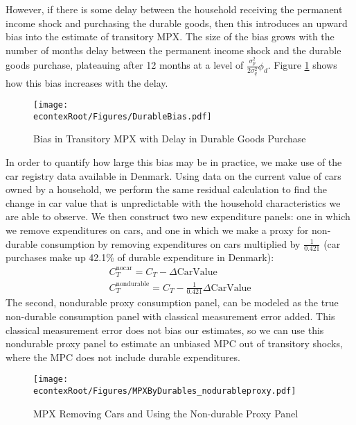 \documentclass[titlepage]{\econtex}\newcommand{\texname}{ConsumptionHeterogeneity}
\begin{document}
However, if there is some delay between the household receiving the permanent income shock and purchasing the durable goods, then this introduces an upward bias into the estimate of transitory MPX. The size of the bias grows with the number of months delay between the permanent income shock and the durable goods purchase, plateauing after 12 months at a level of $\frac{\sigma^2_p}{2\sigma^2_q}\phi_d$. Figure \ref{fig:durable_bias} shows how this bias increases with the delay.
\begin{figure} 
	\begin{centering}
		\texttt{[image: \\econtexRoot/Figures/DurableBias.pdf]}
		\caption{Bias in Transitory MPX with Delay in Durable Goods Purchase}
		\label{fig:durable_bias}
	\end{centering}
\end{figure}

In order to quantify how large this bias may be in practice, we make use of the car registry data available in Denmark. Using data on the current value of cars owned by a household, we perform the same residual calculation to find the change in car value that is unpredictable with the household characteristics we are able to observe. We then construct two new expenditure panels: one in which we remove expenditures on cars, and one in which we make a proxy for non-durable consumption by removing expenditures on cars multiplied by $\frac{1}{0.421}$ (car purchases make up 42.1\% of durable expenditure in Denmark):
\begin{align*}
C_T^{\text{nocar}} = C_T - \Delta \text{CarValue} \\
C_T^{\text{nondurable}} = C_T - \frac{1}{0.421}\Delta \text{CarValue}
\end{align*}
The second, nondurable proxy consumption panel, can be modeled as the true non-durable consumption panel with classical measurement error added. This classical measurement error does not bias our estimates, so we can use this nondurable proxy panel to estimate an unbiased MPC out of transitory shocks, where the MPC does not include durable expenditures.
\begin{figure} 
	\begin{centering}
		\texttt{[image: \\econtexRoot/Figures/MPXByDurables\_nodurableproxy.pdf]}
		\caption{MPX Removing Cars and Using the Non-durable Proxy Panel}
		\label{fig:MPXByDurables}
	\end{centering}
\end{figure}
\end{document}
